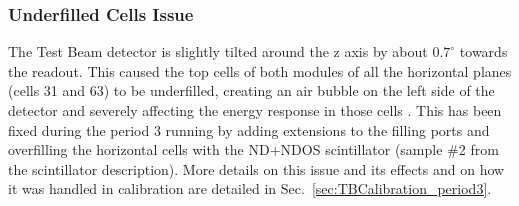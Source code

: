 
\subsubsection*{Underfilled Cells Issue}
The Test Beam detector is slightly tilted around the z axis by about $0.7^{\circ}$ towards the readout. This caused the top cells of both modules of all the horizontal planes (cells 31 and 63) to be underfilled, creating an air bubble on the left side of the detector and severely affecting the energy response in those cells \cite{LackeyThesisNOvATBProtons2022.pdf}. This has been fixed \cite{NOvA-doc-49439} during the period 3 running by adding extensions to the filling ports and overfilling the horizontal cells with the \gls{ND}+\gls{NDOS} scintillator (sample \#2 from the scintillator description). More details on this issue and its effects and on how it was handled in calibration are detailed in Sec.~\ref{sec:TBCalibration_period3}.




